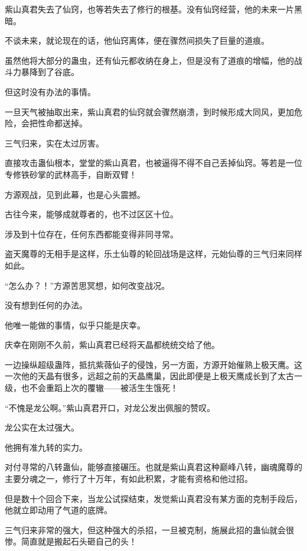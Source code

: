 
\begin{this_body}

紫山真君失去了仙窍，也等若失去了修行的根基。没有仙窍经营，他的未来一片黑暗。

不谈未来，就论现在的话，他仙窍离体，便在骤然间损失了巨量的道痕。

虽然他将大部分的蛊虫，还有仙元都收纳在身上，但是没有了道痕的增幅，他的战斗力暴降到了谷底。

但这时没有办法的事情。

一旦天气被抽取出来，紫山真君的仙窍就会骤然崩溃，到时候形成大同风，更加危险，会把性命都送掉。

三气归来，实在太过厉害。

直接攻击蛊仙根本，堂堂的紫山真君，也被逼得不得不自己丢掉仙窍。等若是一位专修铁砂掌的武林高手，自断双臂！

方源观战，见到此幕，也是心头震撼。

古往今来，能够成就尊者的，也不过区区十位。

涉及到十位存在，任何东西都能变得非同寻常。

盗天魔尊的无相手是这样，乐土仙尊的轮回战场是这样，元始仙尊的三气归来同样如此。

“怎么办？！”方源苦思冥想，如何改变战况。

没有想到任何的办法。

他唯一能做的事情，似乎只能是庆幸。

庆幸在刚刚不久前，紫山真君已经将天晶都统统交给了他。

一边操纵超级蛊阵，抵抗紫薇仙子的侵蚀，另一方面，方源开始催熟上极天鹰。这一次他的天晶有很多，远超之前的天晶鹰巢，因此即便是上极天鹰成长到了太古一级，也不会重蹈上次的覆辙——被活生生饿死！

“不愧是龙公啊。”紫山真君开口，对龙公发出佩服的赞叹。

龙公实在太过强大。

他拥有准九转的实力。

对付寻常的八转蛊仙，能够直接碾压。也就是紫山真君这种巅峰八转，幽魂魔尊的主要分魂之一，修行了十万年，有如此积累，才能有资格和他过招。

但是数十个回合下来，当龙公试探结束，发觉紫山真君没有某方面的克制手段后，他就立即动用了气道的底牌。

三气归来非常的强大，但这种强大的杀招，一旦被克制，施展此招的蛊仙就会很惨。简直就是搬起石头砸自己的头！


\end{this_body}
